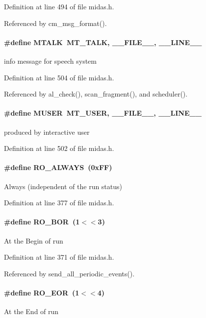 Definition at line 494 of file midas.h.

Referenced by cm\_\-msg\_\-format().
\paragraph[{MTALK}]{\setlength{\rightskip}{0pt plus 5cm}\#define MTALK~MT\_\-TALK,  \_\-\_\-FILE\_\-\_\-, \_\-\_\-LINE\_\-\_\-}\hfill\label{group__mdefineh_gad6a8d32f94873258d0eebcbe5b24a78e}
info message for speech system 

Definition at line 504 of file midas.h.

Referenced by al\_\-check(), scan\_\-fragment(), and scheduler().
\paragraph[{MUSER}]{\setlength{\rightskip}{0pt plus 5cm}\#define MUSER~MT\_\-USER,  \_\-\_\-FILE\_\-\_\-, \_\-\_\-LINE\_\-\_\-}\hfill\label{group__mdefineh_ga34e08186e736dbd7f0b61a23a8ad8d0f}
produced by interactive user 

Definition at line 502 of file midas.h.
\paragraph[{RO\_\-ALWAYS}]{\setlength{\rightskip}{0pt plus 5cm}\#define RO\_\-ALWAYS~(0xFF)}\hfill\label{group__mdefineh_gafb61c915b4df610eb54eeeb781fc2f75}
Always (independent of the run status) 

Definition at line 377 of file midas.h.
\paragraph[{RO\_\-BOR}]{\setlength{\rightskip}{0pt plus 5cm}\#define RO\_\-BOR~(1$<$$<$3)}\hfill\label{group__mdefineh_ga88e94e1aadd86417c8eaa304d8c3b467}
At the Begin of run 

Definition at line 371 of file midas.h.

Referenced by send\_\-all\_\-periodic\_\-events().
\paragraph[{RO\_\-EOR}]{\setlength{\rightskip}{0pt plus 5cm}\#define RO\_\-EOR~(1$<$$<$4)}\hfill\label{group__mdefineh_ga5b505930aa1fc780118b4fc75f771464}
At the End of run 

